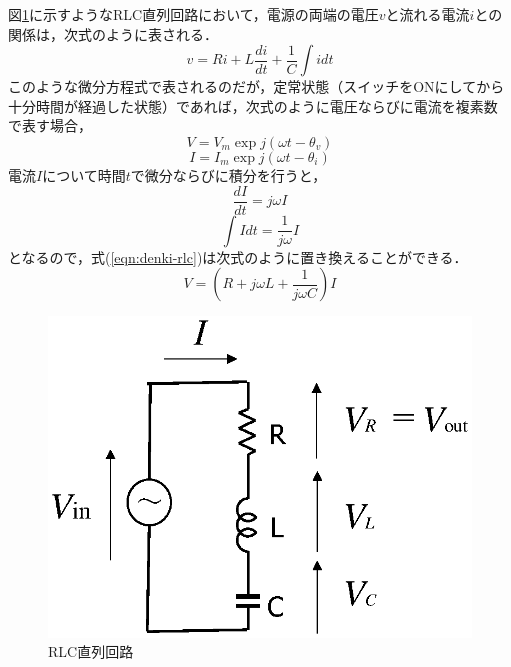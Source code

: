 図\ref{fig:rlc0}に示すようなRLC直列回路において，電源の両端の電圧$v$と流れる電流$i$との関係\footnotemark は，次式のように表される．
\begin{equation}
v=Ri+L\frac{di}{dt}+\frac{1}{C} \int idt
\label{eqn:denki-rlc}
\end{equation}
このような微分方程式で表されるのだが，定常状態（スイッチをONにしてから十分時間が経過した状態）であれば，次式のように電圧ならびに電流を複素数
で表す場合，
\begin{equation}
V=V_m \exp{j(\omega t - \theta_v)}
\end{equation}
\begin{equation}
I=I_m \exp{j(\omega t - \theta_i)}
\end{equation}
電流$I$について時間$t$で微分ならびに積分を行うと，
\begin{equation}
\frac{dI}{dt}=j\omega I
\end{equation}
\begin{equation}
\int Idt=\frac{1}{j\omega} I
\end{equation}
となるので，式(\ref{eqn:denki-rlc})は次式のように置き換えることができる．
\begin{equation}
V=\left ( R+j\omega L + \frac{1}{j\omega C} \right ) I
\label{eqn:denki-rlc1}
\end{equation}


\begin{figure}[H]
\begin{center}
\includegraphics[width=.4\textwidth]{fig/rlc0.eps}
\end{center}
\caption{RLC直列回路}
\label{fig:rlc0}
\end{figure}



